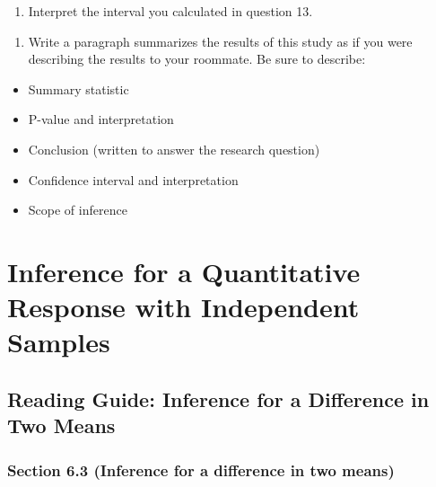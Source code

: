 \documentclass[
]{report}
\providecommand{\tightlist}{%
  \setlength{\itemsep}{0pt}\setlength{\parskip}{0pt}}
\begin{document}
\vspace{0.3in}

\begin{enumerate}
\def\labelenumi{\arabic{enumi}.}
\setcounter{enumi}{13}
\tightlist
\item
  Interpret the interval you calculated in question 13.
\end{enumerate}

\vspace{0.8in}

\begin{enumerate}
\def\labelenumi{\arabic{enumi}.}
\setcounter{enumi}{23}
\tightlist
\item
  Write a paragraph summarizes the results of this study as if you were describing the results to your roommate. Be sure to describe:
\end{enumerate}

\begin{itemize}
\item
  Summary statistic
\item
  P-value and interpretation
\item
  Conclusion (written to answer the research question)
\item
  Confidence interval and interpretation
\item
  Scope of inference
\end{itemize}

\vspace{2.6in}

\newpage

\hypertarget{inference-for-a-quantitative-response-with-independent-samples}{%
\chapter{Inference for a Quantitative Response with Independent Samples}\label{inference-for-a-quantitative-response-with-independent-samples}}

\hypertarget{reading-guide-inference-for-a-difference-in-two-means}{%
\section{Reading Guide: Inference for a Difference in Two Means}\label{reading-guide-inference-for-a-difference-in-two-means}}

\hypertarget{section-6.3-inference-for-a-difference-in-two-means}{%
\subsection*{Section 6.3 (Inference for a difference in two means)}\label{section-6.3-inference-for-a-difference-in-two-means}}
\end{document}
